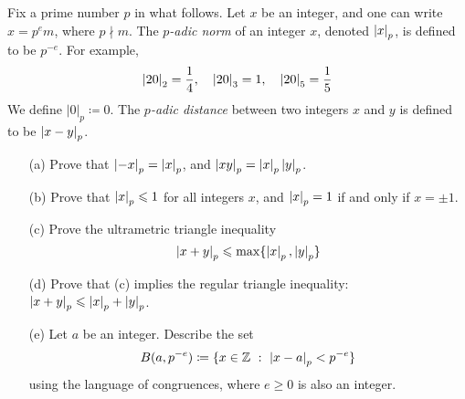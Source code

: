 \vspace*{0.1in}

\begin{problem}\label{Problem 15.3}
Fix a prime number $p$ in what follows. Let $x$ be an integer, and one can write $x = p^em$, where $p\nmid m$.  The \emph{$p$-adic norm} of an integer $x$, denoted $\left\lvert x\right\rvert_p$, is defined to be $p^{-e}$. For example,
\[\left\lvert20\right\rvert_2 = \frac{1}{4},\quad \left\lvert20\right\rvert_{3} = 1,\quad \left\lvert20\right\rvert_{5} = \frac{1}{5}\]
We define $|0|_p \coloneqq 0$. The \emph{$p$-adic distance} between two integers $x$ and $y$ is defined to be $\left\lvert x-y\right\rvert_p$.
\begin{itemize}
\item[(a)] Prove that $\left\lvert-x\right\rvert_p = \left\lvert x\right\rvert_p$, and $\left\lvert xy\right\rvert_p = \left\lvert x\right\rvert_p\left\lvert y\right\rvert_p$.
\item[(b)] Prove that $\left\lvert x\right\rvert_p \leqslant 1$ for all integers $x$, and $\left\lvert x\right\rvert_p = 1$ if and only if $x = \pm 1$.
\item[(c)] Prove the ultrametric triangle inequality
\[\left\lvert x+y\right\rvert_p \leqslant \max\{\left\lvert x\right\rvert_p,\left\lvert y\right\rvert_p\}\]
\item[(d)] Prove that (c) implies the regular triangle inequality: $\left\lvert x+y\right\rvert_p \leqslant \left\lvert x\right\rvert_p + \left\lvert y\right\rvert_p$.
\item[(e)] Let $a$ be an integer. Describe the set
\[B(a,p^{-e}) \coloneqq \{x \in \mathbb Z\ :\ \left\lvert x-a\right\rvert_p < p^{-e}\}\]
using the language of congruences, where $e\geq 0$ is also an integer.
\end{itemize}
\end{problem}

\vspace*{0.3in}

